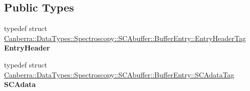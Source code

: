 \subsection*{Public Types}
\begin{DoxyCompactItemize}
\item 
\mbox{\label{class_canberra_1_1_data_types_1_1_spectroscopy_1_1_s_c_abuffer_1_1_buffer_entry_abd8e1a18ea8e2c402a732d26098a5333}} 
typedef struct \hyperlink{class_canberra_1_1_data_types_1_1_spectroscopy_1_1_s_c_abuffer_1_1_buffer_entry_de/d72/struct_canberra_1_1_data_types_1_1_spectroscopy_1_1_s_c_abuffer_1_1_buffer_entry_1_1_entry_header_tag}{Canberra\+::\+Data\+Types\+::\+Spectroscopy\+::\+S\+C\+Abuffer\+::\+Buffer\+Entry\+::\+Entry\+Header\+Tag} {\bfseries Entry\+Header}
\item 
\mbox{\label{class_canberra_1_1_data_types_1_1_spectroscopy_1_1_s_c_abuffer_1_1_buffer_entry_a768aea5a3a0fcc7bab6307fb996f9bf7}} 
typedef struct \hyperlink{class_canberra_1_1_data_types_1_1_spectroscopy_1_1_s_c_abuffer_1_1_buffer_entry_de/dd8/struct_canberra_1_1_data_types_1_1_spectroscopy_1_1_s_c_abuffer_1_1_buffer_entry_1_1_s_c_adata_tag}{Canberra\+::\+Data\+Types\+::\+Spectroscopy\+::\+S\+C\+Abuffer\+::\+Buffer\+Entry\+::\+S\+C\+Adata\+Tag} {\bfseries S\+C\+Adata}
\end{DoxyCompactItemize}
